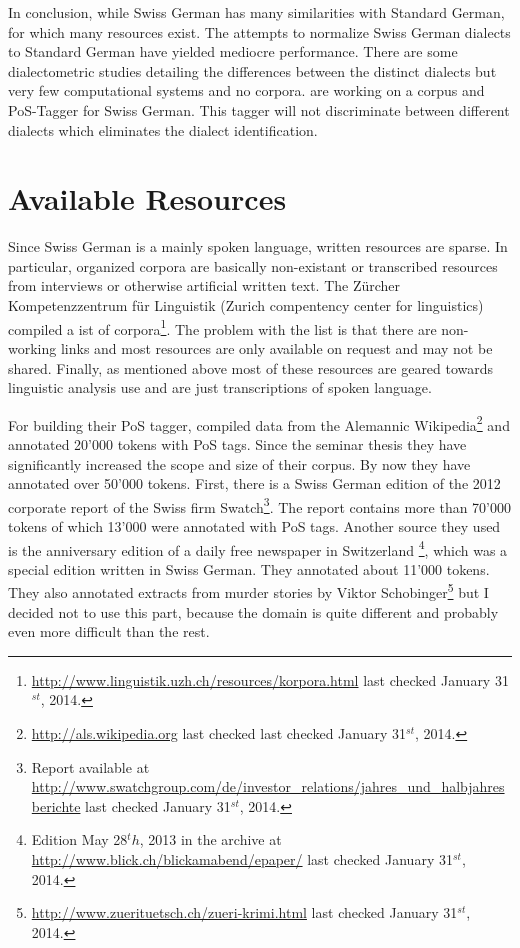 \documentclass[11pt,letterpaper]{article}
\begin{document}
In conclusion, while Swiss German has many similarities with Standard German, for which many resources exist. The attempts to normalize Swiss German dialects to Standard German have yielded mediocre performance. There are some dialectometric studies detailing the differences between the distinct dialects but very few computational systems and no corpora. \citet{AH14} are working on a corpus and PoS-Tagger for Swiss German. This tagger will not discriminate between different dialects which eliminates the dialect identification.

\section{Available Resources}

Since Swiss German is a mainly spoken language, written resources are sparse. In particular, organized corpora are basically non-existant or transcribed resources from interviews or otherwise artificial written text. The Zürcher Kompetenzzentrum für Linguistik (Zurich compentency center for linguistics) compiled a ist of corpora\footnote{\url{http://www.linguistik.uzh.ch/resources/korpora.html} last checked January 31$^{st}$, 2014.}. The problem with the list is that there are non-working links and most resources are only available on request and may not be shared. Finally, as mentioned above most of these resources are geared towards linguistic analysis use and are just transcriptions of spoken language. 

For building their PoS tagger, \citet{AH12} compiled data from the Alemannic Wikipedia\footnote{\url{http://als.wikipedia.org} last checked last checked January 31$^{st}$, 2014.} and annotated 20'000 tokens with PoS tags. Since the seminar thesis they have significantly increased the scope and size of their corpus. By now they have annotated over 50'000 tokens. First, there is a Swiss German edition of the 2012 corporate report of the Swiss firm Swatch\footnote{Report available at \url{http://www.swatchgroup.com/de/investor_relations/jahres_und_halbjahresberichte} last checked January 31$^{st}$, 2014.}. The report contains more than 70'000 tokens of which 13'000 were annotated with PoS tags. Another source they used is the anniversary edition of a daily free newspaper in Switzerland \footnote{Edition May 28$^th$, 2013 in the archive at \url{http://www.blick.ch/blickamabend/epaper/}  last checked January 31$^{st}$, 2014.}, which was a special edition written in Swiss German. They annotated about 11'000 tokens. They also annotated extracts from murder stories by Viktor Schobinger\footnote{\url{http://www.zuerituetsch.ch/zueri-krimi.html}  last checked January 31$^{st}$, 2014.} but I decided not to use this part, because the domain is quite different and probably even more difficult than the rest. \citep{AH14}
\end{document}
